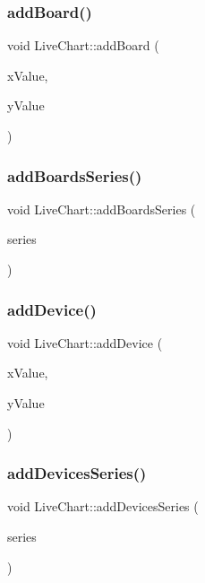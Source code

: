\subsubsection{\texorpdfstring{add\+Board()}{addBoard()}}
{\footnotesize\ttfamily void Live\+Chart\+::add\+Board (\begin{DoxyParamCaption}\item[{qreal}]{x\+Value,  }\item[{qreal}]{y\+Value }\end{DoxyParamCaption})}

\mbox{\label{class_live_chart_a611bd4a559e178df00527a138fa4b3bf}} 
\subsubsection{\texorpdfstring{add\+Boards\+Series()}{addBoardsSeries()}}
{\footnotesize\ttfamily void Live\+Chart\+::add\+Boards\+Series (\begin{DoxyParamCaption}\item[{Q\+Scatter\+Series $\ast$}]{series }\end{DoxyParamCaption})}

\mbox{\label{class_live_chart_a216e4fb970fceb8d6234ef40f0399391}} 
\subsubsection{\texorpdfstring{add\+Device()}{addDevice()}}
{\footnotesize\ttfamily void Live\+Chart\+::add\+Device (\begin{DoxyParamCaption}\item[{qreal}]{x\+Value,  }\item[{qreal}]{y\+Value }\end{DoxyParamCaption})}

\mbox{\label{class_live_chart_a69d9fa408a72a003c8995267dd26b712}} 
\subsubsection{\texorpdfstring{add\+Devices\+Series()}{addDevicesSeries()}}
{\footnotesize\ttfamily void Live\+Chart\+::add\+Devices\+Series (\begin{DoxyParamCaption}\item[{Q\+Scatter\+Series $\ast$}]{series }\end{DoxyParamCaption})}

